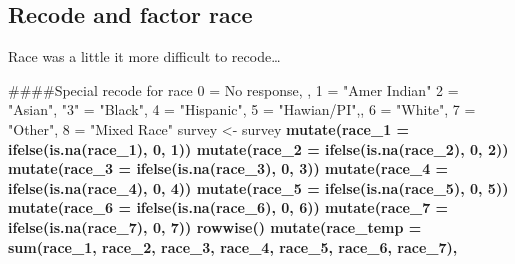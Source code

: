 \documentclass[]{article}
\newenvironment{Shaded}{\begin{snugshade}}{\end{snugshade}}
\newcommand{\KeywordTok}[1]{\textcolor[rgb]{0.13,0.29,0.53}{\textbf{#1}}}
\newcommand{\DataTypeTok}[1]{\textcolor[rgb]{0.13,0.29,0.53}{#1}}
\newcommand{\DecValTok}[1]{\textcolor[rgb]{0.00,0.00,0.81}{#1}}
\newcommand{\StringTok}[1]{\textcolor[rgb]{0.31,0.60,0.02}{#1}}
\newcommand{\OperatorTok}[1]{\textcolor[rgb]{0.81,0.36,0.00}{\textbf{#1}}}
\newcommand{\NormalTok}[1]{#1}
\begin{document}
\subsection{Recode and factor race}\label{recode-and-factor-race}

Race was a little it more difficult to recode\ldots{}

\begin{Shaded}
\begin{Highlighting}[]
\NormalTok{####Special recode for race 0 = No response, , 1 = "Amer Indian" 2 = "Asian", "3" = "Black", 4 = "Hispanic", 5 = "Hawian/PI",, 6 = "White", 7 = "Other", 8 = "Mixed Race"}
\NormalTok{survey <-}\StringTok{ }\NormalTok{survey }\OperatorTok{%>%}\StringTok{ }
\StringTok{ }\KeywordTok{mutate}\NormalTok{(}\DataTypeTok{race_1 =} \KeywordTok{ifelse}\NormalTok{(}\KeywordTok{is.na}\NormalTok{(race_}\DecValTok{1}\NormalTok{), }\DecValTok{0}\NormalTok{, }\DecValTok{1}\NormalTok{))}\OperatorTok{%>%}\StringTok{ }
\StringTok{ }\KeywordTok{mutate}\NormalTok{(}\DataTypeTok{race_2 =} \KeywordTok{ifelse}\NormalTok{(}\KeywordTok{is.na}\NormalTok{(race_}\DecValTok{2}\NormalTok{), }\DecValTok{0}\NormalTok{, }\DecValTok{2}\NormalTok{)) }\OperatorTok{%>%}\StringTok{ }
\StringTok{ }\KeywordTok{mutate}\NormalTok{(}\DataTypeTok{race_3 =} \KeywordTok{ifelse}\NormalTok{(}\KeywordTok{is.na}\NormalTok{(race_}\DecValTok{3}\NormalTok{), }\DecValTok{0}\NormalTok{, }\DecValTok{3}\NormalTok{)) }\OperatorTok{%>%}\StringTok{ }
\StringTok{ }\KeywordTok{mutate}\NormalTok{(}\DataTypeTok{race_4 =} \KeywordTok{ifelse}\NormalTok{(}\KeywordTok{is.na}\NormalTok{(race_}\DecValTok{4}\NormalTok{), }\DecValTok{0}\NormalTok{, }\DecValTok{4}\NormalTok{)) }\OperatorTok{%>%}\StringTok{ }
\StringTok{ }\KeywordTok{mutate}\NormalTok{(}\DataTypeTok{race_5 =} \KeywordTok{ifelse}\NormalTok{(}\KeywordTok{is.na}\NormalTok{(race_}\DecValTok{5}\NormalTok{), }\DecValTok{0}\NormalTok{, }\DecValTok{5}\NormalTok{)) }\OperatorTok{%>%}\StringTok{ }
\StringTok{ }\KeywordTok{mutate}\NormalTok{(}\DataTypeTok{race_6 =} \KeywordTok{ifelse}\NormalTok{(}\KeywordTok{is.na}\NormalTok{(race_}\DecValTok{6}\NormalTok{), }\DecValTok{0}\NormalTok{, }\DecValTok{6}\NormalTok{)) }\OperatorTok{%>%}\StringTok{ }
\StringTok{ }\KeywordTok{mutate}\NormalTok{(}\DataTypeTok{race_7 =} \KeywordTok{ifelse}\NormalTok{(}\KeywordTok{is.na}\NormalTok{(race_}\DecValTok{7}\NormalTok{), }\DecValTok{0}\NormalTok{, }\DecValTok{7}\NormalTok{)) }\OperatorTok{%>%}
\StringTok{  }\KeywordTok{rowwise}\NormalTok{() }\OperatorTok{%>%}\StringTok{ }
\StringTok{ }\KeywordTok{mutate}\NormalTok{(}\DataTypeTok{race_temp =} \KeywordTok{sum}\NormalTok{(race_}\DecValTok{1}\NormalTok{, race_}\DecValTok{2}\NormalTok{, race_}\DecValTok{3}\NormalTok{, race_}\DecValTok{4}\NormalTok{, race_}\DecValTok{5}\NormalTok{, race_}\DecValTok{6}\NormalTok{, race_}\DecValTok{7}\NormalTok{),}
}}}}}}}}}
\end{Highlighting}
\end{Shaded}
\end{document}
